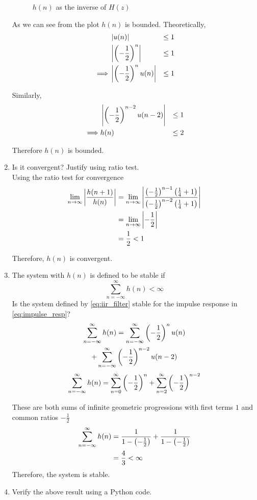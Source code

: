 \documentclass[journal,12pt,twocolumn]{IEEEtran}
\renewcommand\thesection{\arabic{section}}
\begin{document}
\begin{enumerate}[label=\thesection.\arabic*]
\begin{figure}[!ht]
\caption{$h(n)$ as the inverse of $H(z)$}
\label{fig:hn}
\end{figure}
As we can see from the plot $h(n)$ is bounded.
Theoretically,
	\begin{align}
		&\left\vert u(n)\right\vert &\le 1 \\
		&\left\vert\left(-\frac12\right)^n\right\vert &\le 1 \\
		\implies &\left\vert\left(-\frac12\right)^n u(n)\right\vert &\le 1
	\end{align}
	
	Similarly,
	\begin{align}
		&\left\vert\left(-\frac12\right)^{n-2} u(n-2)\right\vert &\le 1 \\
		\implies &h(n) &\le 2
	\end{align}
	
	Therefore $h(n)$ is bounded.
  \item Is it convergent? Justify using ratio test.\\
  \solution Using the ratio test for convergence
	\begin{align}
		\lim_{n \to \infty} \left\vert\frac{h(n+1)}{h(n)}\right\vert &= \lim_{n \to \infty} \left\vert\frac{\left(-\frac12\right)^{n-1} \left(\frac14 + 1\right)}{\left(-\frac12\right)^{n-2} \left(\frac14 + 1\right)}\right\vert \\
		&= \lim_{n \to \infty} \left\vert-\frac12\right\vert \\
		&= \frac{1}{2} < 1
	\end{align}
	
	Therefore, $h(n)$ is convergent.
\item The system with $h(n)$ is defined to be stable if
\begin{equation}
\sum_{n=-\infty}^{\infty}h(n) < \infty
\end{equation}
Is the system defined by \eqref{eq:iir_filter} stable for the impulse response in \eqref{eq:impulse_resp}?\\
\solution
	\begin{multline}
		\sum_{n=-\infty}^{\infty}h(n) = \sum_{n=-\infty}^{\infty} \left(-\frac12\right)^n u(n) \\
		+ \sum_{n=-\infty}^{\infty} \left(-\frac12\right)^{n-2} u(n-2)
	\end{multline}
	\begin{align}
		\sum_{n=-\infty}^{\infty}h(n) = \sum_{n=0}^{\infty}\left(-\frac12\right)^n + \sum_{n=2}^{\infty}\left(-\frac12\right)^{n-2}
	\end{align}
	
	These are both sums of infinite geometric progressions with first terms $1$ and common ratios $-\frac12$
	\begin{align}
		\sum_{n=-\infty}^{\infty}h(n) &= \frac{1}{1 - \left(-\frac12\right)} + \frac{1}{1 - \left(-\frac12\right)} \\
		&= \frac{4}{3} < \infty
	\end{align}
	Therefore, the system is stable. 
  \item Verify the above result using a Python code. 
	

\end{enumerate}
\end{document}
